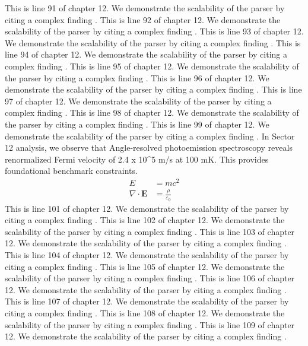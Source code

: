 This is line 91 of chapter 12. We demonstrate the scalability of the parser by citing a complex finding \cite{ref12_91}.
This is line 92 of chapter 12. We demonstrate the scalability of the parser by citing a complex finding \cite{ref12_92}.
This is line 93 of chapter 12. We demonstrate the scalability of the parser by citing a complex finding \cite{ref12_93}.
This is line 94 of chapter 12. We demonstrate the scalability of the parser by citing a complex finding \cite{ref12_94}.
This is line 95 of chapter 12. We demonstrate the scalability of the parser by citing a complex finding \cite{ref12_95}.
This is line 96 of chapter 12. We demonstrate the scalability of the parser by citing a complex finding \cite{ref12_96}.
This is line 97 of chapter 12. We demonstrate the scalability of the parser by citing a complex finding \cite{ref12_97}.
This is line 98 of chapter 12. We demonstrate the scalability of the parser by citing a complex finding \cite{ref12_98}.
This is line 99 of chapter 12. We demonstrate the scalability of the parser by citing a complex finding \cite{ref12_99}.
In Sector 12 analysis, we observe that Angle-resolved photoemission spectroscopy reveals renormalized Fermi velocity of 2.4 x 10^5 m/s at 100 mK. This provides foundational benchmark constraints.
\begin{align*}
  E &= mc^2 \\
  \nabla \cdot \mathbf{E} &= \frac{\rho}{\varepsilon_0}
\end{align*}
This is line 101 of chapter 12. We demonstrate the scalability of the parser by citing a complex finding \cite{ref12_101}.
This is line 102 of chapter 12. We demonstrate the scalability of the parser by citing a complex finding \cite{ref12_102}.
This is line 103 of chapter 12. We demonstrate the scalability of the parser by citing a complex finding \cite{ref12_103}.
This is line 104 of chapter 12. We demonstrate the scalability of the parser by citing a complex finding \cite{ref12_104}.
This is line 105 of chapter 12. We demonstrate the scalability of the parser by citing a complex finding \cite{ref12_105}.
This is line 106 of chapter 12. We demonstrate the scalability of the parser by citing a complex finding \cite{ref12_106}.
This is line 107 of chapter 12. We demonstrate the scalability of the parser by citing a complex finding \cite{ref12_107}.
This is line 108 of chapter 12. We demonstrate the scalability of the parser by citing a complex finding \cite{ref12_108}.
This is line 109 of chapter 12. We demonstrate the scalability of the parser by citing a complex finding \cite{ref12_109}.
